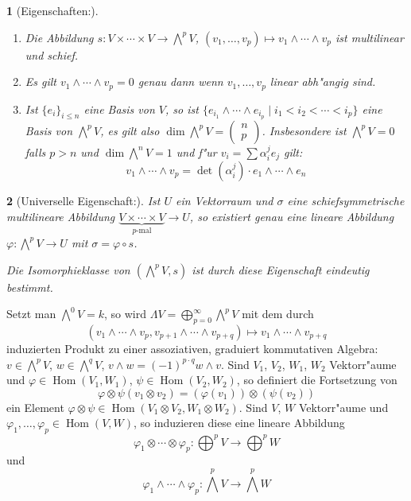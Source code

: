 \documentclass[paper=A4, twoside, chapterprefix=true, bibliography=totoc, headsepline]{scrbook}
\let\temp\phi
\let\phi\varphi
\let\varphi\temp
\let\temp\theta
\let\theta\vartheta
\let\vartheta\temp
\let\temp\epsilon
\let\epsilon\varepsilon
\let\varepsilon\temp
\let\temp\rho
\let\rho\varrho
\let\varrho\temp
\DeclareMathOperator{\Hom}{Hom} %
\newcommand{\X}{\times}
\theoremstyle{plain}
\theoremstyle{nonumberplain}
\theoremstyle{empty}
\newtheorem{emptythm}{}%
\theoremstyle{break}
\begin{document}
\begin{emptythm}[Eigenschaften:]
  \begin{enumerate}[label=(\arabic*),leftmargin=*]
  \item Die Abbildung $s: V \X \cdots \X V \to \bigwedge^p V$, $(v_1, \ldots ,v_p) \mapsto v_1 \wedge \cdots \wedge v_p$ ist multilinear und schief.
  \item Es gilt $v_1 \wedge \cdots \wedge v_p = 0$ genau dann wenn $v_1, \ldots , v_p$ linear abh"angig sind.
  \item Ist $\{e_i\}_{i \le n}$ eine Basis von $V$, so ist $\{e_{i_1} \wedge \cdots \wedge e_{i_p} \mid i_1 < i_2 < \cdots < i_p\}$ eine Basis von $\bigwedge^pV$, es gilt also $\dim \bigwedge^pV = \left( \begin{smallmatrix} n \\ p \end{smallmatrix} \right)$.
    Insbesondere ist $\bigwedge^pV = 0$ falls $p > n$ und $\dim \bigwedge^nV = 1$ und f"ur $v_i = \sum \alpha_i^j e_j$ gilt:
    \[ v_1 \wedge \cdots \wedge v_p = \det (\alpha_i^j) \cdot e_1 \wedge \cdots \wedge e_n \]
  \end{enumerate}
\end{emptythm}

\begin{emptythm}[Universelle Eigenschaft:]
Ist $U$ ein Vektorraum und $\sigma$ eine schiefsymmetrische multilineare Abbildung $\underbrace{V \X \cdots \X V}_{p\text{-mal}} \to U$, so existiert genau eine lineare Abbildung $\phi: \bigwedge^pV \to U$ mit $\sigma = \phi \circ s$.
\begin{center}\end{center}
Die Isomorphieklasse von $(\bigwedge^pV, s)$ ist durch diese Eigenschaft eindeutig bestimmt.
\end{emptythm}

Setzt man $\bigwedge^0V = k$, so wird $\Lambda V = \bigoplus_{p=0}^{\infty}\bigwedge^pV$ mit dem durch
	\[ (v_1 \wedge \cdots \wedge v_p, v_{p+1} \wedge \cdots \wedge v_{p+q}) \mapsto v_1 \wedge \cdots \wedge v_{p+q} \]
induzierten Produkt zu einer assoziativen, graduiert kommutativen Algebra: $v \in \bigwedge^pV$, $w \in \bigwedge^qV$, $v \wedge w = (-1)^{p \cdot q} w \wedge v$. Sind $V_1$, $V_2$, $W_1$, $W_2$ Vektorr"aume und $\phi \in \Hom(V_1, W_1)$, $\psi \in \Hom(V_2, W_2)$, so definiert die Fortsetzung von 
	\[ \phi \otimes \psi (v_1 \otimes v_2) = (\phi(v_1)) \otimes (\psi(v_2)) \]
ein Element $\phi \otimes \psi \in \Hom(V_1 \otimes V_2, W_1 \otimes W_2)$. Sind $V$, $W$ Vektorr"aume und $\phi_1,\ldots ,\phi_p \in \Hom(V, W)$, so induzieren diese eine lineare Abbildung
	\[ \phi_1 \otimes \cdots \otimes \phi_p : \bigoplus^p V \to \bigoplus^p W \]
und
	\[ \phi_1 \wedge \cdots  \wedge \phi_p : \bigwedge^pV \to \bigwedge^pW \]
\end{document}
